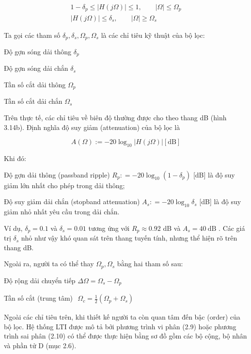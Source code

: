 \documentclass[
  10
]{article}
\begin{document}
\[
\begin{array}{r} 1 - \delta_ {p} \leq | H (j \Omega) | \leq 1, \qquad | \Omega | \leq \Omega_ {p} \\ | H (j \Omega) | \leq \delta_ {s}, \qquad | \Omega | \geq \Omega_ {s} \end{array}
\]

Ta gọi các tham số
\(\delta _ { p } , \delta _ { s } , \Omega _ { p } , \Omega _ { s }\) là
các chỉ tiêu kỹ thuật của bộ lọc:

Độ gợn sóng dải thông \(\delta _ { p }\)

Độ gợn sóng dải chắn \(\delta _ { s }\)

Tần số cắt dải thông \(\Omega _ { p }\)

Tần số cắt dải chắn \(\Omega _ { s }\)

Trên thực tế, các chỉ tiêu về biên độ thường được cho theo thang dB
(hình 3.14b). Định nghĩa độ suy giảm (attenuation) của bộ lọc là

\[
A (\Omega) := - 2 0 \log_ {1 0} | H (j \Omega) | [ \mathrm{dB} ]
\]

Khi đó:

Độ gợn dải thông (passband ripple)
\(R _ { p } : = - 2 0 \log _ { 1 0 } ( 1 - \delta _ { p } )\) {[}dB{]}
là độ suy giảm lớn nhất cho phép trong dải thông;

Độ suy giảm dải chắn (stopband attenuation)
\(A _ { s } : = - 2 0 \log _ { 1 0 } \delta _ { s }\) {[}dB{]} là độ suy
giảm nhỏ nhất yêu cầu trong dải chắn.

Ví dụ, \(\delta _ { p } = 0 . 1\) và \(\delta _ { s } = 0 . 0 1\) tương
ứng với \(R _ { p } \approx 0 . 9 2\) dB và
\(A _ { s } = 4 0 ~ \mathrm { d B }\) . Các giá trị \(\delta _ { s }\)
nhỏ như vậy khó quan sát trên thang tuyến tính, nhưng thể hiện rõ trên
thang dB.

Ngoài ra, người ta có thể thay \(\Omega _ { p } , \Omega _ { s }\) bằng
hai tham số sau:

Độ rộng dải chuyển tiếp
\(\Delta \Omega = \Omega _ { s } - \Omega _ { p }\)

Tần số cắt (trung tâm)
\(\begin{array} { r } { \Omega _ { c } = \frac { 1 } { 2 } ( \Omega _ { p } + \Omega _ { s } ) } \end{array}\)

Ngoài các chỉ tiêu trên, khi thiết kế người ta còn quan tâm đến bậc
(order) của bộ lọc. Hệ thống LTI được mô tả bởi phương trình vi phân
(2.9) hoặc phương trình sai phân (2.10) có thể được thực hiện bằng sơ đồ
gồm các bộ cộng, bộ nhân và phần tử D (mục 2.6).
\end{document}
